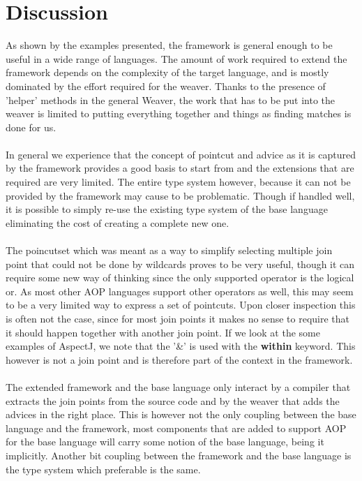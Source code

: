 \documentclass[a4paper]{report}
\begin{document}
\chapter{Discussion}
As shown by the examples presented, the framework is general enough to be useful in a wide range of languages. The amount of work required to extend the framework depends on the complexity of the target language, and is mostly dominated by the effort required for the weaver. Thanks to the presence of 'helper' methods in the general Weaver, the work that has to be put into the weaver is limited to putting everything together and things as finding matches is done for us.\\
\\
In general we experience that the concept of pointcut and advice as it is captured by the framework provides a good basis to start from and the extensions that are required are very limited. The entire type system however, because it can not be provided by the framework may cause to be problematic. Though if handled well, it is possible to simply re-use the existing type system of the base language eliminating the cost of creating a complete new one.\\
\\
The poincutset which was meant as a way to simplify selecting multiple join point that could not be done by wildcards proves to be very useful, though it can require some new way of thinking since the only supported operator is the logical or. As most other AOP languages support other operators as well, this may seem to be a very limited way to express a set of pointcuts. Upon closer inspection this is often not the case, since for most join points it makes no sense to require that it should happen together with another join point. If we look at the some examples of AspectJ, we note that the '\&' is used with the \textbf{within} keyword. This however is not a join point and is therefore part of the context in the framework.\\
\\
The extended framework and the base language only interact by a compiler that extracts the join points from the source code and by the weaver that adds the advices in the right place. This is however not the only coupling between the base language and the framework, most components that are added to support AOP for the base language will carry some notion of the base language, being it implicitly. Another bit coupling between the framework and the base language is the type system which preferable is the same.\\
\end{document}
